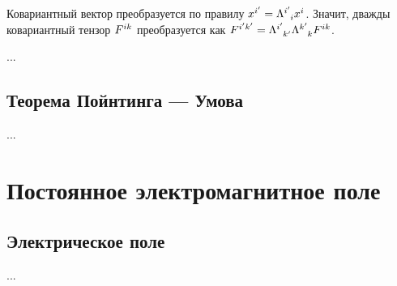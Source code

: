 \documentclass{article}
\begin{document}
Ковариантный вектор преобразуется по правилу $x^{i'}=\tensor{\Lambda}{^{i'}_{i}} x^i$. Значит, дважды ковариантный тензор $\tensor{F}{^i^k}$ преобразуется как $\tensor{F}{^{i'}^{k'}}=\tensor{\Lambda}{^{i'}_{k'}}\tensor{\Lambda}{^{k'}_{k}} \tensor{F}{^i^k}$.

...

\subsection{Теорема Пойнтинга — Умова}

...

\section{Постоянное электромагнитное поле}

\subsection{Электрическое поле}

...
\end{document}
